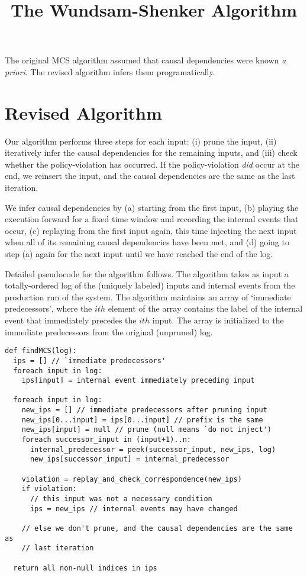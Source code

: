 \documentclass[10pt,a4paper,titlepage]{article}
\newcommand{\apriori}{{\it a priori}}
\begin{document}
\title{The Wundsam-Shenker Algorithm\textsuperscript{\texttrademark}}
  \date{}
  \maketitle{}

The original MCS algorithm assumed that causal dependencies were known
\apriori. The revised algorithm infers them programatically.

\section*{Revised Algorithm}

Our algorithm performs three steps for each input:
(i) prune the input, (ii) iteratively infer the causal dependencies for the
remaining inputs, and (iii) check whether the policy-violation has occurred. If
the policy-violation {\it did} occur at the end, we reinsert the input, and the causal
dependencies are the same as the last iteration.

We infer causal dependencies by (a) starting from the first input, (b)
playing the execution forward for a fixed time window and recording the internal events
that occur, (c) replaying from the first input again, this time injecting
the next input when all of its remaining causal dependencies have been met, and (d)
going to step (a) again for the next input until we have reached the end of
the log.

Detailed pseudocode for the algorithm follows. The algorithm takes as input a
totally-ordered log of the (uniquely labeled) inputs and internal events from the production run
of the system. The algorithm maintains an array of `immediate predecessors', where the
$ith$ element of the array contains the label of the internal event that
immediately precedes the $ith$ input. The array is initialized to the immediate
predecessors from the original (unpruned) log.

\begin{verbatim}
def findMCS(log):
  ips = [] // `immediate predecessors'
  foreach input in log:
    ips[input] = internal event immediately preceding input
  
  foreach input in log:
    new_ips = [] // immediate predecessors after pruning input
    new_ips[0...input] = ips[0...input] // prefix is the same
    new_ips[input] = null // prune (null means `do not inject')
    foreach successor_input in (input+1)..n:
      internal_predecessor = peek(successor_input, new_ips, log)
      new_ips[successor_input] = internal_predecessor
    
    violation = replay_and_check_correspondence(new_ips)
    if violation:
      // this input was not a necessary condition
      ips = new_ips // internal events may have changed

    // else we don't prune, and the causal dependencies are the same as
    // last iteration
  
  return all non-null indices in ips
\end{verbatim}
\end{document}
